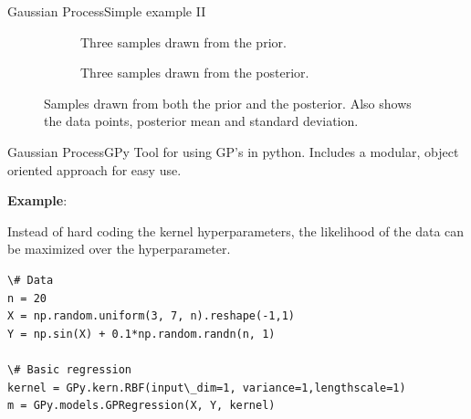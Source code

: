 \documentclass{beamer}
\begin{document}
\begin{frame}{Gaussian Process}{Simple example II}

	\newlength{\figureheight}
	\newlength{\figurewidth}
	
	\begin{figure}[!t]
		\small
		\centering  
		\begin{subfigure}[b]{0.45\linewidth}
			\centering 
			\setlength\figureheight{4cm}
			\setlength\figurewidth{\linewidth}
			
			\caption{Three samples drawn from the prior.}
		\end{subfigure}
		\begin{subfigure}[b]{0.45\linewidth}
			\centering 
			\setlength\figureheight{4cm}
			\setlength\figurewidth{\linewidth}    
			
			\caption{Three samples drawn from the posterior.}
		\end{subfigure}
		\caption{Samples drawn from both the prior and the posterior. Also shows the data points, posterior mean and standard deviation.}
	\end{figure}

\end{frame}

\begin{frame}[fragile]{Gaussian Process}{GPy}
	Tool for using GP's in python. Includes a modular, object oriented approach for easy use. \linebreak
	
	\textbf{Example}:
	
	Instead of hard coding the kernel hyperparameters, the likelihood of the data can be maximized over the hyperparameter. 
	
\begin{Verbatim}[fontsize=\footnotesize]
\# Data
n = 20
X = np.random.uniform(3, 7, n).reshape(-1,1)
Y = np.sin(X) + 0.1*np.random.randn(n, 1)
		 
\# Basic regression
kernel = GPy.kern.RBF(input\_dim=1, variance=1,lengthscale=1)
m = GPy.models.GPRegression(X, Y, kernel)
\end{Verbatim}
\end{frame}
\end{document}
